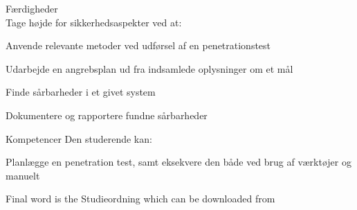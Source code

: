 \documentclass[Screen16to9,17pt]{foils}
\begin{document}
Færdigheder\\
Tage højde for sikkerhedsaspekter ved at:
\begin{list2}
\item Anvende relevante metoder ved udførsel af en penetrationstest
\item Udarbejde en angrebsplan ud fra indsamlede oplysninger om et mål
\item Finde sårbarheder i et givet system
 \item Dokumentere og rapportere fundne sårbarheder
\end{list2}

Kompetencer
Den studerende kan:
\begin{list2}
\item Planlægge en penetration test, samt eksekvere den både ved brug af værktøjer og manuelt
\end{list2}



Final word is the Studieordning which can be downloaded from\\
{\footnotesize {}\\
}
\end{document}
